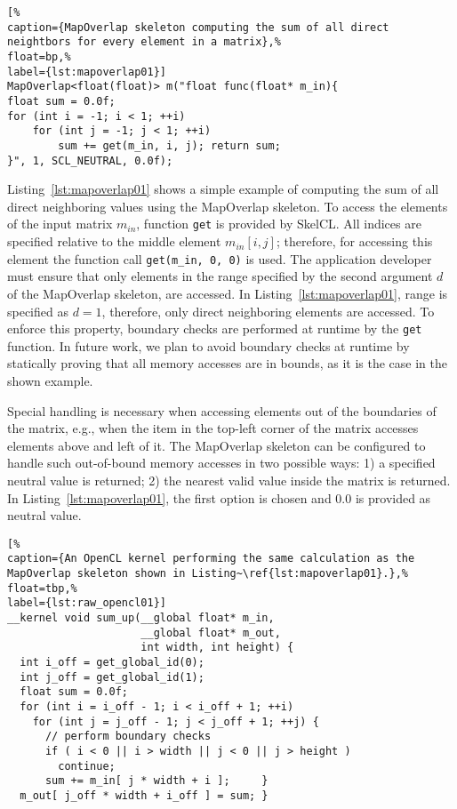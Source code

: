 \begin{lstlisting}[%
caption={MapOverlap skeleton computing the sum of all direct neightbors for every element in a matrix},%
float=bp,%
label={lst:mapoverlap01}]
MapOverlap<float(float)> m("float func(float* m_in){
float sum = 0.0f;
for (int i = -1; i < 1; ++i)
	for (int j = -1; j < 1; ++i)
 		sum += get(m_in, i, j); return sum;
}", 1, SCL_NEUTRAL, 0.0f);
\end{lstlisting}


Listing~\ref{lst:mapoverlap01} shows a simple example of computing the sum of all direct neighboring values using the MapOverlap skeleton.
To access the elements of the input matrix $m_{in}$, function \texttt{get} is provided by SkelCL.
All indices are specified relative to the middle element $m_{in}[i,j]$; therefore, for accessing this element the function call \texttt{get(m\_in, 0, 0)} is used.
The application developer must ensure that only elements in the range specified by the second argument $d$ of the MapOverlap skeleton, are accessed.
In Listing~\ref{lst:mapoverlap01}, range is specified as $d=1$, therefore, only direct neighboring elements are accessed.
To enforce this property, boundary checks are performed at runtime by the \texttt{get} function.
In future work, we plan to avoid boundary checks at runtime by statically proving that all memory accesses are in bounds, as it is the case in the shown example.


Special handling is necessary when accessing elements out of the boundaries of the matrix, e.g., when the item in the top-left corner of the matrix accesses elements above and left of it.
The MapOverlap skeleton can be configured to handle such out-of-bound memory accesses in two possible ways:
1) a specified neutral value is returned;
2) the nearest valid value inside the matrix is returned.
In Listing~\ref{lst:mapoverlap01}, the first option is chosen and $0.0$ is provided as neutral value.

\begin{lstlisting}[%
caption={An OpenCL kernel performing the same calculation as the MapOverlap skeleton shown in Listing~\ref{lst:mapoverlap01}.},%
float=tbp,%
label={lst:raw_opencl01}]
__kernel void sum_up(__global float* m_in,
                     __global float* m_out,
                     int width, int height) {
  int i_off = get_global_id(0); 
  int j_off = get_global_id(1);
  float sum = 0.0f;
  for (int i = i_off - 1; i < i_off + 1; ++i)
    for (int j = j_off - 1; j < j_off + 1; ++j) {
      // perform boundary checks
      if ( i < 0 || i > width || j < 0 || j > height )
        continue;
      sum += m_in[ j * width + i ];     }
  m_out[ j_off * width + i_off ] = sum; }
\end{lstlisting}


